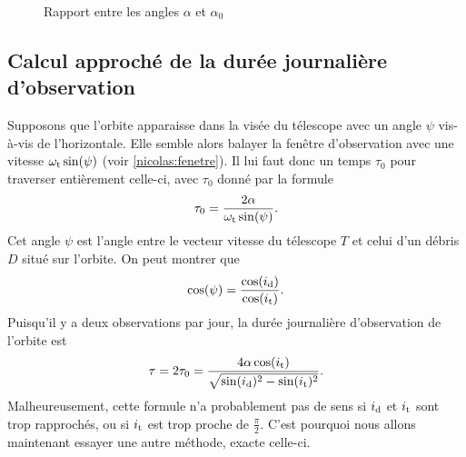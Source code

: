 \begin{figure}
\begin{center}
\scriptsize
\def\figurewidth{0.6\linewidth}

\caption{Rapport entre les angles $\alpha$ et $\alpha_0$} \label{nicolas:alpha}
\end{center}
\end{figure}


\subsection{Calcul approché de la durée journalière d'observation}

Supposons que l'orbite apparaisse dans la visée du télescope avec un angle $\psi$ vis-à-vis de l'horizontale. Elle semble alors balayer la fenêtre d'observation avec une vitesse $\omega_\text{t} \sin(\psi)$ (voir \autoref{nicolas:fenetre}). Il lui faut donc un temps $\tau_0$ pour traverser entièrement celle-ci, avec $\tau_0$ donné par la formule
\[ \tau_0 = \frac{2\alpha}{\omega_\text{t} \sin(\psi)}.\]
Cet angle $\psi$ est l'angle entre le vecteur vitesse du télescope $T$ et celui d'un débris $D$ situé sur l'orbite. 
On peut montrer que
\[ 
\cos(\psi) = \frac{\cos(i_\text{d})}{\cos(i_\text{t})}.
\]
Puisqu'il y a deux observations par jour, la durée journalière d'observation de l'orbite est
\[ \tau = 2\tau_0 = \frac{4\alpha\cos(i_\text{t})}{\sqrt{\sin(i_\text{d})^2 - \sin(i_\text{t})^2}}.\]
Malheureusement, cette formule n'a probablement pas de sens si $i_\text{d}$ et $i_\text{t}$ sont trop rapprochés, ou si $i_\text{t}$ est trop proche de $\frac{\pi}{2}$. C'est pourquoi nous allons maintenant essayer une autre méthode, exacte celle-ci.

